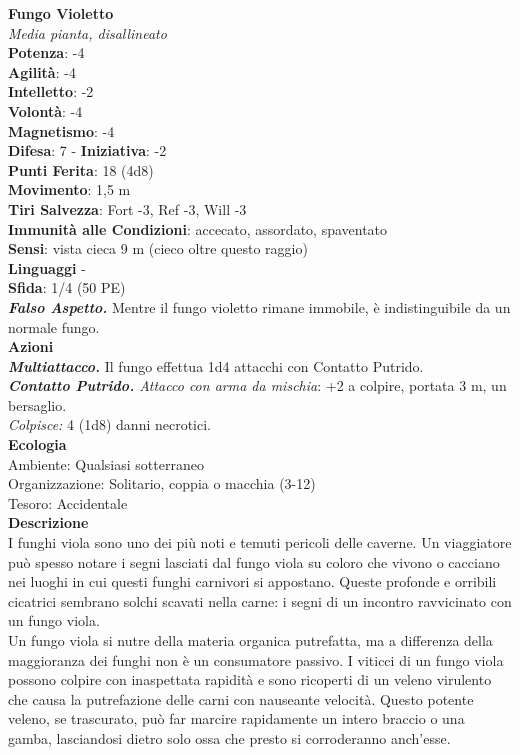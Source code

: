 \begin{multicols}{2}
\medskip\textbf{Fungo Violetto}\\
\emph{Media pianta, disallineato}\\
\textbf{Potenza}: -4\\
\textbf{Agilità}: -4\\
\textbf{Intelletto}: -2\\
\textbf{Volontà}: -4\\
\textbf{Magnetismo}: -4\\
\textbf{Difesa}: 7 - \textbf{Iniziativa}: -2\\
\textbf{Punti Ferita}: 18 (4d8)\\
\textbf{Movimento}: 1,5 m\\
\textbf{Tiri Salvezza}: Fort -3, Ref -3, Will -3\\
\textbf{Immunità alle Condizioni}: accecato, assordato, spaventato\\
\textbf{Sensi}: vista cieca 9 m (cieco oltre questo raggio)\\
\textbf{Linguaggi} -\\
\textbf{Sfida}: 1/4 (50 PE)\smallskip\\
\emph{\textbf{Falso Aspetto.}} Mentre il fungo violetto rimane immobile, è indistinguibile da un normale fungo.\\
\smallskip\textbf{Azioni}\\
\emph{\textbf{Multiattacco.}} Il fungo effettua 1d4 attacchi con Contatto Putrido.\\
\emph{\textbf{Contatto Putrido.} Attacco con arma da mischia}: +2 a colpire, portata 3 m, un bersaglio.\\
\emph{Colpisce:} 4 (1d8) danni necrotici.\\
\textbf{Ecologia}\\
Ambiente: Qualsiasi sotterraneo\\
Organizzazione: Solitario, coppia o macchia (3-12)\\
Tesoro: Accidentale\\
\textbf{Descrizione}\\
I funghi viola sono uno dei più noti e temuti pericoli delle caverne. Un viaggiatore può spesso notare i segni lasciati dal fungo viola su coloro che vivono o cacciano nei luoghi in cui questi funghi carnivori si appostano. Queste profonde e orribili cicatrici sembrano solchi scavati nella carne: i segni di un incontro ravvicinato con un fungo viola.\\
Un fungo viola si nutre della materia organica putrefatta, ma a differenza della maggioranza dei funghi non è un consumatore passivo. I viticci di un fungo viola possono colpire con inaspettata rapidità e sono ricoperti di un veleno virulento che causa la putrefazione delle carni con nauseante velocità. Questo potente veleno, se trascurato, può far marcire rapidamente un intero braccio o una gamba, lasciandosi dietro solo ossa che presto si corroderanno anch’esse.\\

\end{multicols}
